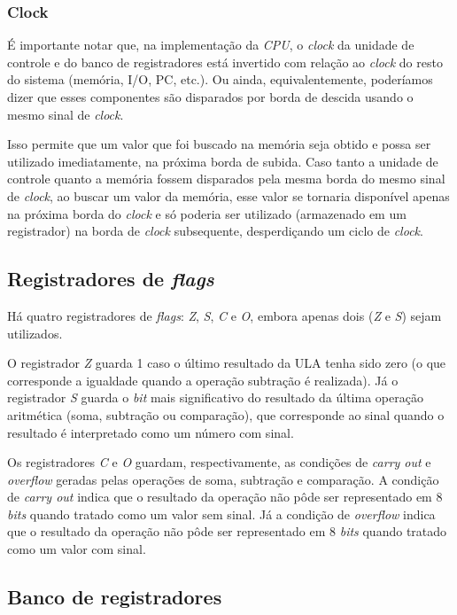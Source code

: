 \documentclass[a4paper,12pt]{report}
\begin{document}
\subsubsection*{Clock}

É importante notar que, na implementação da \textit{CPU}, o \textit{clock} da unidade de
controle e do banco de registradores está invertido com relação ao \textit{clock} do resto
do sistema (memória, I/O, PC, etc.). Ou ainda, equivalentemente, poderíamos dizer que esses
componentes são disparados por borda de descida usando o mesmo sinal de \textit{clock}.

Isso permite que um valor que foi buscado na memória seja obtido e possa ser utilizado 
imediatamente, na próxima borda de subida. Caso tanto a unidade de controle quanto a memória
fossem disparados pela mesma borda do mesmo sinal de \textit{clock}, ao buscar um valor 
da memória, esse valor se tornaria disponível apenas na próxima borda do \textit{clock} e 
só poderia ser utilizado (armazenado em um registrador) na borda de \textit{clock} subsequente, 
desperdiçando um ciclo de \textit{clock}.

\subsection*{Registradores de \textit{flags}}

Há quatro registradores de \textit{flags}: \textit{Z}, \textit{S}, \textit{C} e \textit{O},
embora apenas dois (\textit{Z} e \textit{S}) sejam utilizados.

O registrador \textit{Z} guarda 1 caso o último resultado da ULA tenha sido zero (o que corresponde
a igualdade quando a operação subtração é realizada). Já o registrador \textit{S} guarda o 
\textit{bit} mais significativo do resultado da última operação aritmética (soma, subtração ou 
comparação), que corresponde ao sinal quando o resultado é interpretado como um número com
sinal.

Os registradores \textit{C} e \textit{O} guardam, respectivamente, as condições de \textit{carry out}
e \textit{overflow} geradas pelas operações de soma, subtração e comparação. A condição de 
\textit{carry out} indica que o resultado da operação não pôde ser representado em 8 \textit{bits} 
quando tratado como um valor sem sinal. Já a condição de \textit{overflow} indica que o resultado 
da operação não pôde ser representado em 8 \textit{bits} quando tratado como um valor com sinal.

\subsection*{Banco de registradores}
\end{document}
